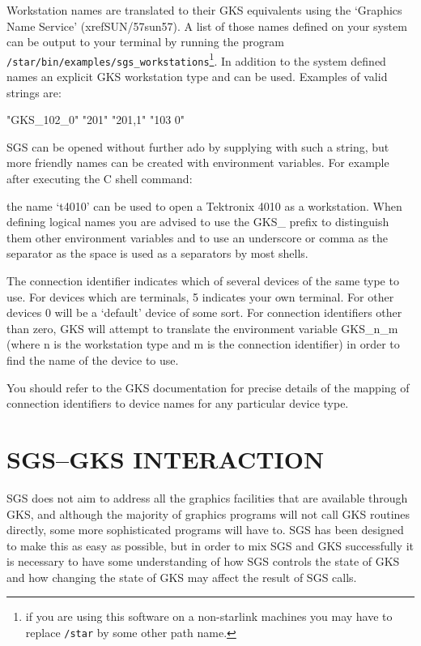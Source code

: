\documentclass[11pt]{starlink}
\begin{document}
Workstation names are translated to their GKS equivalents using the `Graphics
Name Service' (xref{SUN/57}{sun57}{}).
A list of those names defined on your system can be
output to your terminal by running the program
\texttt{/star/bin/examples/sgs\_workstations}\footnote{if you are using this
software on a non-starlink machines you may have to replace \texttt{/star} by some
other path name.}.
In addition to the system defined names an explicit
GKS workstation type and  can be used.
Examples of valid strings are:
\begin{terminalv}
"GKS_102_0"
"201"
"201,1"
"103 0"
\end{terminalv}
SGS can be opened without further ado by supplying
 with such a string,
but more friendly names can be created with environment variables.  For example after
executing the C shell command:
\begin{terminalv}
\end{terminalv}
the name `t4010' can be used to open a Tektronix 4010 as a workstation.
When defining logical
names you are advised to use the GKS\_ prefix to distinguish them other
environment variables and to use an underscore or comma as the separator as
the space is used as a separators by most shells.

The connection identifier indicates which of several devices of the same type
to use.  For devices which are terminals, 5 indicates your own terminal.  For
other devices 0 will be a `default' device of some sort.  For connection
identifiers other than zero, GKS will attempt to translate the environment
variable
GKS\_n\_m (where n is the workstation type and m is the connection identifier)
in order to find the name of the device to use.

You should
refer to the GKS documentation for precise details of the mapping of connection
identifiers to device names for any particular device type.

\section {SGS--GKS INTERACTION}\label{app-interaction}

SGS does not aim to address all the graphics facilities that are available
through GKS, and although the majority of graphics programs will not call GKS
routines directly, some more sophisticated programs will have to.
SGS has been designed to make this as easy as possible, but in order to mix
SGS and GKS successfully it is necessary to have some understanding of how SGS
controls the state of GKS and how changing the state of GKS may affect the
result of SGS calls.
\end{document}
